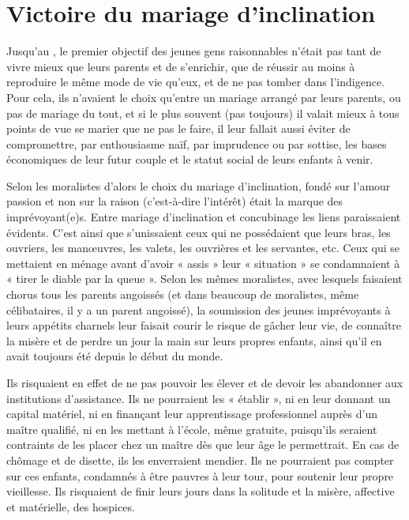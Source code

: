 
\chapter{Victoire du mariage d'inclination}


 Jusqu'au , le premier objectif des jeunes gens raisonnables n'était pas tant de vivre mieux que leurs parents et de s'enrichir, que de réussir au moins à reproduire le même mode de vie qu'eux, et de ne pas tomber dans l'indigence. Pour cela, ils n'avaient le choix qu'entre un mariage arrangé par leurs parents, ou pas de mariage du tout, et si le plus souvent (pas toujours) il valait mieux à tous points de vue se marier que ne pas le faire, il leur fallait aussi éviter de compromettre, par enthousiasme naïf, par imprudence ou par sottise, les bases économiques de leur futur couple et le statut social de leurs enfants à venir. 

 Selon les moralistes d'alors le choix du mariage d'inclination, fondé sur l'amour passion et non sur la raison (c'est-à-dire l'intérêt) était la marque des imprévoyant(e)s. Entre mariage d'inclination et concubinage les liens paraissaient évidents. C'est ainsi que s'unissaient ceux qui ne possédaient que leurs bras, les ouvriers, les manœuvres, les valets, les ouvrières et les servantes, etc. Ceux qui se mettaient en ménage avant d'avoir « assis » leur « situation » se condamnaient à « tirer le diable par la queue ». Selon les mêmes moralistes, avec lesquels faisaient chorus tous les parents angoissés (et dans beaucoup de moralistes, même célibataires, il y a un parent angoissé), la soumission des jeunes imprévoyants à leurs appétits charnels leur faisait courir le risque de gâcher leur vie, de connaître la misère et de perdre un jour la main sur leurs propres enfants, ainsi qu'il en avait toujours été depuis le début du monde. 

 Ils risquaient en effet de ne pas pouvoir les élever et de devoir les abandonner aux institutions d'assistance. Ils ne pourraient les « établir », ni en leur donnant un capital matériel, ni en finançant leur apprentissage professionnel auprès d'un maître qualifié, ni en les mettant à l'école, même gratuite, puisqu'ils seraient contraints de les placer chez un maître dès que leur âge le permettrait. En cas de chômage et de disette, ils les enverraient mendier. Ils ne pourraient pas compter sur ces enfants, condamnés à être pauvres à leur tour, pour soutenir leur propre vieillesse. Ils risquaient de finir leurs jours dans la solitude et la misère, affective et matérielle, des hospices.


